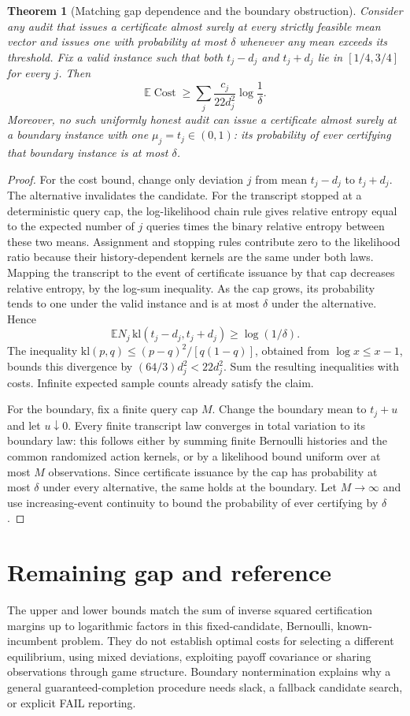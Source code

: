 \documentclass[11pt]{article}
\newtheorem{theorem}{Theorem}
\theoremstyle{remark}\newtheorem{remark}[theorem]{Remark}
\newcommand{\E}{\mathbb E}
\begin{document}
\begin{theorem}[Matching gap dependence and the boundary obstruction]
Consider any audit that issues a certificate almost surely at every strictly feasible mean vector and issues one with probability at most $\delta$ whenever any mean exceeds its threshold. Fix a valid instance such that both $t_j-d_j$ and $t_j+d_j$ lie in $[1/4,3/4]$ for every $j$. Then
\[
 \E\operatorname{Cost}\ge
 \sum_j\frac{c_j}{22d_j^2}\log\frac1\delta.
\]
Moreover, no such uniformly honest audit can issue a certificate almost surely at a boundary instance with one $\mu_j=t_j\in(0,1)$: its probability of ever certifying that boundary instance is at most $\delta$.
\end{theorem}
\begin{proof}
For the cost bound, change only deviation $j$ from mean $t_j-d_j$ to $t_j+d_j$. The alternative invalidates the candidate. For the transcript stopped at a deterministic query cap, the log-likelihood chain rule gives relative entropy equal to the expected number of $j$ queries times the binary relative entropy between these two means. Assignment and stopping rules contribute zero to the likelihood ratio because their history-dependent kernels are the same under both laws. Mapping the transcript to the event of certificate issuance by that cap decreases relative entropy, by the log-sum inequality. As the cap grows, its probability tends to one under the valid instance and is at most $\delta$ under the alternative. Hence
\[
 \E N_j\,\mathrm{kl}(t_j-d_j,t_j+d_j)\ge\log(1/\delta).
\]
The inequality $\mathrm{kl}(p,q)\le(p-q)^2/[q(1-q)]$, obtained from $\log x\le x-1$, bounds this divergence by $(64/3)d_j^2<22d_j^2$. Sum the resulting inequalities with costs. Infinite expected sample counts already satisfy the claim.

For the boundary, fix a finite query cap $M$. Change the boundary mean to $t_j+u$ and let $u\downarrow0$. Every finite transcript law converges in total variation to its boundary law: this follows either by summing finite Bernoulli histories and the common randomized action kernels, or by a likelihood bound uniform over at most $M$ observations. Since certificate issuance by the cap has probability at most $\delta$ under every alternative, the same holds at the boundary. Let $M\to\infty$ and use increasing-event continuity to bound the probability of ever certifying by $\delta$.
\end{proof}

\section*{Remaining gap and reference}
The upper and lower bounds match the sum of inverse squared certification margins up to logarithmic factors in this fixed-candidate, Bernoulli, known-incumbent problem. They do not establish optimal costs for selecting a different equilibrium, using mixed deviations, exploiting payoff covariance or sharing observations through game structure. Boundary nontermination explains why a general guaranteed-completion procedure needs slack, a fallback candidate search, or explicit FAIL reporting.
\end{document}
